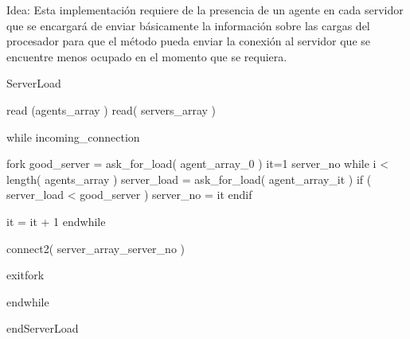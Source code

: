 
\vartriangleright Idea: Esta implementación requiere de la presencia de un agente en cada servidor que se encargará de enviar básicamente
la información sobre las cargas del procesador para que el método pueda enviar la conexión al servidor que se encuentre menos ocupado en el
momento que se requiera.

\begin{code}

ServerLoad

	read (agents_array )
	read( servers_array )
	
	while incoming_connection
	
		fork
			good_server = ask_for_load( agent_array_{0} )
			it=1
			server_no
			while i < length( agents_array )
				server_load = ask_for_load( agent_array_{it} )
				if ( server_load < good_server )
					server_no = it
				endif
			
			it = it + 1
			endwhile
			
			connect2( server_array_{server_no} )
			
		
		exitfork
	
	endwhile

endServerLoad

\end{code}